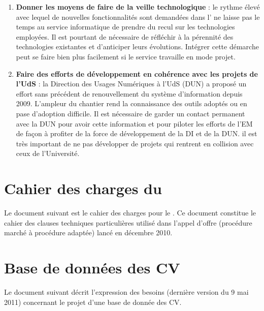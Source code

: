 \documentclass{book}
\begin{document}
\begin{enumerate}
\item \textbf{Donner les moyens de faire de la veille technologique} : le rythme
élevé avec lequel de nouvelles fonctionnalités sont demandées dans l'
ne laisse pas le temps au service informatique de prendre du recul sur les technologies
employées. Il est pourtant de nécessaire de réfléchir à la pérennité des technologies
existantes et d'anticiper leurs évolutions. Intégrer cette démarche peut se faire
bien plus facilement si le service travaille en mode projet.\\


\item \textbf{Faire des efforts de développement en cohérence avec les projets de l'UdS} : 
la Direction des Usages Numériques à l'UdS (DUN) a proposé un effort sans précédent de renouvellement
du système d'information depuis 2009. L'ampleur du chantier rend la connaissance des
outils adoptés ou en pase d'adoption difficile. Il est nécessaire de garder un contact
permanent avec la DUN pour avoir cette information et pour piloter les efforts de 
l'EM de façon à profiter de la force de développement de la DI et de la DUN.
il est très important de ne pas développer de projets qui rentrent en collision avec 
ceux de l'Université. 


\end{enumerate}


%	





\appendix

\printindex

\chapter{Cahier des charges du }
\label{ch:annexe-crm}

Le document suivant est le cahier des charges pour le .
Ce document constitue le cahier des clauses techniques particulières
utilisé dans l'appel d'offre (procédure marché à procédure adaptée)
lancé en décembre 2010. 




\chapter{Base de données des CV}
\label{ch:rh-cvtheque}

Le document suivant décrit l'expression des besoins (dernière version du 9 mai 2011)
concernant le projet d'une base de donnée des CV.



\end{document}
